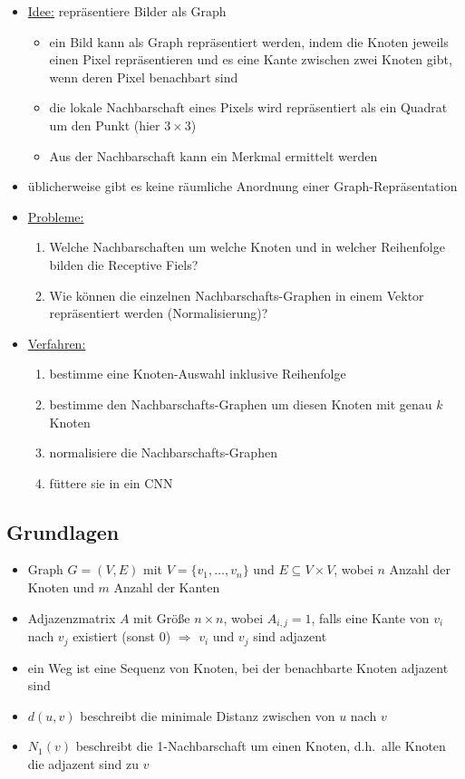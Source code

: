 \begin{itemize}
  \item \underline{Idee:} repräsentiere Bilder als Graph
    \begin{itemize}
      \item ein Bild kann als Graph repräsentiert werden, indem die Knoten jeweils einen Pixel repräsentieren und es eine Kante zwischen zwei Knoten gibt, wenn deren Pixel benachbart sind
      \item die lokale Nachbarschaft eines Pixels wird repräsentiert als ein Quadrat um den Punkt (hier $3 \times 3$)
      \item Aus der Nachbarschaft kann ein Merkmal ermittelt werden
    \end{itemize}
  \item üblicherweise gibt es keine räumliche Anordnung einer Graph-Repräsentation
  \item \underline{Probleme:}
    \begin{enumerate}
      \item Welche Nachbarschaften um welche Knoten und in welcher Reihenfolge bilden die Receptive Fiels?
      \item Wie können die einzelnen Nachbarschafts-Graphen in einem Vektor repräsentiert werden (Normalisierung)?
    \end{enumerate}
  \item \underline{Verfahren:}
    \begin{enumerate}
      \item bestimme eine Knoten-Auswahl inklusive Reihenfolge
      \item bestimme den Nachbarschafts-Graphen um diesen Knoten mit genau $k$ Knoten
      \item normalisiere die Nachbarschafts-Graphen
      \item füttere sie in ein CNN
    \end{enumerate}
\end{itemize}

\subsection{Grundlagen}

\begin{itemize}
  \item Graph $G = (V, E)$ mit $V = \lbrace v_1, \ldots, v_n \rbrace$ und $E \subseteq V \times V$, wobei $n$ Anzahl der Knoten und $m$ Anzahl der Kanten
  \item Adjazenzmatrix $A$ mit Größe $n \times n$, wobei $A_{i,j} = 1$, falls eine Kante von $v_i$ nach $v_j$ existiert (sonst $0$) $\Rightarrow$ $v_i$ und $v_j$ sind adjazent
  \item ein Weg ist eine Sequenz von Knoten, bei der benachbarte Knoten adjazent sind
  \item $d(u,v)$ beschreibt die minimale Distanz zwischen von $u$ nach $v$
  \item $N_1(v)$ beschreibt die 1-Nachbarschaft um einen Knoten, d.h.\ alle Knoten die adjazent sind zu $v$
\end{itemize}

